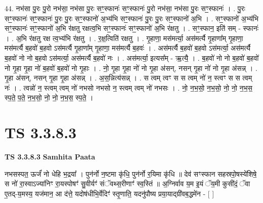 \documentclass[17pt]{extarticle}
\begin{document}
44. नभ॑सा पु॒रः पु॒रो नभ॑सा॒ नभ॑सा पु॒रः सꣳ॒॒स्फानः॑ सꣳ॒॒स्फानः॑ पु॒रो नभ॑सा॒ नभ॑सा पु॒रः सꣳ॒॒स्फानः॑ । . पु॒रः सꣳ॒॒स्फानः॑ सꣳ॒॒स्फानः॑ पु॒रः पु॒रः सꣳ॒॒स्फानो॑ अ॒भ्य॑भि सꣳ॒॒स्फानः॑ पु॒रः पु॒रः सꣳ॒॒स्फानो॑ अ॒भि । . सꣳ॒॒स्फानो॑ अ॒भ्य॑भि सꣳ॒॒स्फानः॑ सꣳ॒॒स्फानो॑ अ॒भि र॑क्षतु रक्षत्व॒भि सꣳ॒॒स्फानः॑ सꣳ॒॒स्फानो॑ अ॒भि र॑क्षतु । . सꣳ॒॒स्फान॒ इति॑ सम् - स्फानः॑ । . अ॒भि र॑क्षतु रक्ष त्व॒भ्य॑भि र॑क्षतु । . र॒क्ष॒त्विति॑ रक्षतु । . गृ॒हाणा॒ मस॑मर्त्या॒ अस॑मर्त्यै गृ॒हाणा᳚म् गृ॒हाणा॒ मस॑मर्त्यै ब॒हवो॑ ब॒हवो ऽस॑मर्त्यै गृ॒हाणा᳚म् गृ॒हाणा॒ मस॑मर्त्यै ब॒हवः॑ । . अस॑मर्त्यै ब॒हवो॑ ब॒हवो ऽस॑मर्त्या॒ अस॑मर्त्यै ब॒हवो॑ नो नो ब॒हवो ऽस॑मर्त्या॒ अस॑मर्त्यै ब॒हवो॑ नः । . अस॑मर्त्या॒ इत्यस᳚म् - ऋ॒त्यै॒ । . ब॒हवो॑ नो नो ब॒हवो॑ ब॒हवो॑ नो गृ॒हा गृ॒हा नो॑ ब॒हवो॑ ब॒हवो॑ नो गृ॒हाः । . नो॒ गृ॒हा गृ॒हा नो॑ नो गृ॒हा अ॑सन्, नसन् गृ॒हा नो॑ नो गृ॒हा अ॑सन्न् । . गृ॒हा अ॑सन्, नसन् गृ॒हा गृ॒हा अ॑सन्न् । . अ॒स॒न्नित्य॑सन्न् । . स त्वम् त्वꣳ स स त्वम् नो॑ न॒ स्त्वꣳ स स त्वम् नः॑ । . त्वन्नो॑ न॒ स्त्वम् त्वम् नो॑ नभसो नभसो न॒ स्त्वम् त्वम् नो॑ नभसः । . नो॒ न॒भ॒सो॒ न॒भ॒सो॒ नो॒ नो॒ न॒भ॒स॒ स्प॒ते॒ प॒ते॒ न॒भ॒सो॒ नो॒ नो॒ न॒भ॒स॒ स्प॒ते॒ । \newline
\pagebreak
{}

\section{ TS 3.3.8.3 }

\textbf{TS 3.3.8.3 } \newline
\textbf{Samhita Paata} \newline

नभसस्पत॒ ऊर्जं॑ नो धेहि भ॒द्रया᳚ । पुन॑र्नो न॒ष्टमा कृ॑धि॒ पुन॑र्नो र॒यिमा कृ॑धि ॥ देव॑ सꣳस्फान सहस्रपो॒षस्ये॑शिषे॒ स नो॑ रा॒स्वाऽज्या॑निꣳ रा॒यस्पोषꣳ॑ सु॒वीर्यꣳ॑ संॅवथ्स॒रीणाꣳ॑ स्व॒स्तिं ॥ अ॒ग्निर्वाव य॒म इ॒यं ॅय॒मी कुसी॑दं॒ ॅवा ए॒तद्-य॒मस्य॒ यज॑मान॒ आ द॑त्ते॒ यदोष॑धीभि॒र्वेदिꣳ॑ स्तृ॒णाति॒ यदनु॑पौष्य प्रया॒याद्ग्री॑वब॒द्धमे॑न - [  ] \newline
\end{document}
